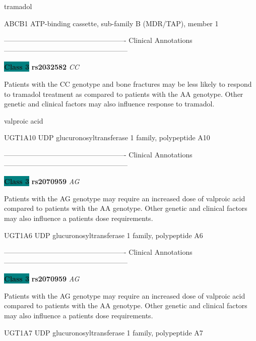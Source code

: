 \documentclass{resume} %
\begin{document}
\begin{rSection}{ tramadol }
\begin{rSubsection}{ ABCB1 }{ ATP-binding cassette, sub-family B (MDR/TAP), member 1 }{}{}
\item[] ---------------------------------------------------- Clinical Annotations -----------------------------------------------------\newline
\item \textbf{\colorbox{teal} {Class 3}} \textbf{ rs2032582 } \textit{ CC }
\item[] Patients with the CC genotype and bone fractures may be less likely to respond to tramadol treatment as compared to patients with the AA genotype. Other genetic and clinical factors may also influence response to tramadol. 
\end{rSubsection}

\end{rSection}\begin{rSection}{ valproic acid }
\item[]

\begin{rSubsection}{ UGT1A10 }{ UDP glucuronosyltransferase 1 family, polypeptide A10 }{}{}
\item[]

\item[] ---------------------------------------------------- Clinical Annotations -----------------------------------------------------\newline
\item \textbf{\colorbox{teal} {Class 3}} \textbf{ rs2070959 } \textit{ AG }
\item[] Patients with the AG genotype may require an increased dose of valproic acid compared to patients with the AA genotype. Other genetic and clinical factors may also influence a patients dose requirements.
\end{rSubsection}\begin{rSubsection}{ UGT1A6 }{ UDP glucuronosyltransferase 1 family, polypeptide A6 }{}{}
\item[]

\item[] ---------------------------------------------------- Clinical Annotations -----------------------------------------------------\newline
\item \textbf{\colorbox{teal} {Class 3}} \textbf{ rs2070959 } \textit{ AG }
\item[] Patients with the AG genotype may require an increased dose of valproic acid compared to patients with the AA genotype. Other genetic and clinical factors may also influence a patients dose requirements.
\end{rSubsection}\begin{rSubsection}{ UGT1A7 }{ UDP glucuronosyltransferase 1 family, polypeptide A7 }{}{}
\item[]


\end{rSubsection}
\end{rSection}
\end{document}
